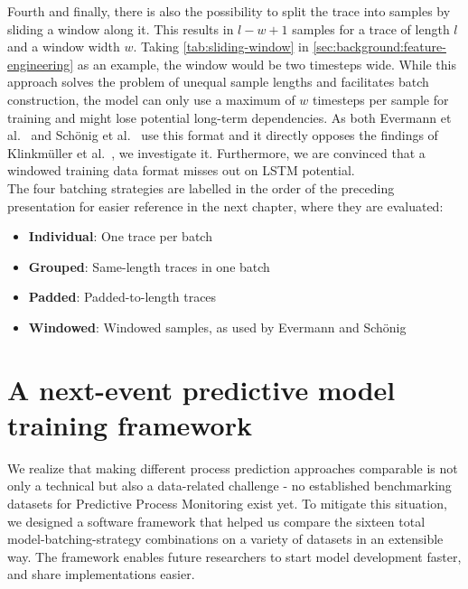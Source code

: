 Fourth and finally, there is also the possibility to split the trace into samples by sliding a window along it. This results in $l-w+1$ samples for a trace of length $l$ and a window width $w$. Taking \autoref{tab:sliding-window} in \autoref{sec:background:feature-engineering} as an example, the window would be two timesteps wide. While this approach solves the problem of unequal sample lengths and facilitates batch construction, the model can only use a maximum of $w$ timesteps per sample for training and might lose potential long-term dependencies. As both Evermann et al.~\cite{evermann2016} and Schönig et al.~\cite{schoenig2018} use this format and it directly opposes the findings of Klinkmüller et al.~\cite{klinkmuller2018reliablemonitoring}, we investigate it. Furthermore, we are convinced that a windowed training data format misses out on LSTM potential.\\

The four batching strategies are labelled in the order of the preceding presentation for easier reference in the next chapter, where they are evaluated:
\begin{itemize}
\item\textbf{Individual}: One trace per batch
\item\textbf{Grouped}: Same-length traces in one batch
\item\textbf{Padded}: Padded-to-length traces
\item\textbf{Windowed}: Windowed samples, as used by Evermann and Schönig
\end{itemize}

\section{A next-event predictive model training framework}
\label{sec:contrib:training-framework}
We realize that making different process prediction approaches comparable is not only a technical but also a data-related challenge - no established benchmarking datasets for Predictive Process Monitoring exist yet.
To mitigate this situation, we designed a software framework that helped us compare the sixteen total model-batching-strategy combinations on a variety of datasets in an extensible way. The framework enables future researchers to start model development faster, and share implementations easier.\\

